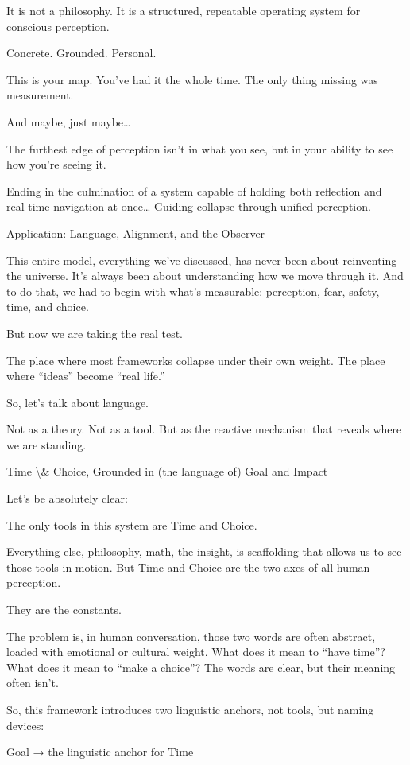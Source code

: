 \documentclass[12pt]{article}
\begin{document}
It is not a philosophy.
It is a structured, repeatable operating system for conscious perception.

Concrete. Grounded. Personal.

This is your map.
You’ve had it the whole time.
The only thing missing was measurement.

And maybe, just maybe…

The furthest edge of perception isn’t in what you see,
but in your ability to see how you’re seeing it.

Ending in the culmination of a system capable of holding both reflection and real-time navigation at once…
Guiding collapse through unified perception.

Application: Language, Alignment, and the Observer

This entire model, everything we’ve discussed, has never been about reinventing the universe. It’s always been about understanding how we move through it. And to do that, we had to begin with what’s measurable: perception, fear, safety, time, and choice.

But now we are taking the real test.

The place where most frameworks collapse under their own weight.
The place where “ideas” become “real life.”

So, let’s talk about language.

Not as a theory.
Not as a tool.
But as the reactive mechanism that reveals where we are standing.

Time \textbackslash{}& Choice, Grounded in (the language of) Goal and Impact

Let’s be absolutely clear:

The only tools in this system are Time and Choice.

Everything else, philosophy, math, the insight, is scaffolding that allows us to see those tools in motion. But Time and Choice are the two axes of all human perception.

They are the constants.

The problem is, in human conversation, those two words are often abstract, loaded with emotional or cultural weight. What does it mean to “have time”? What does it mean to “make a choice”? The words are clear, but their meaning often isn’t.

So, this framework introduces two linguistic anchors, not tools, but naming devices:

Goal → the linguistic anchor for Time
\end{document}
